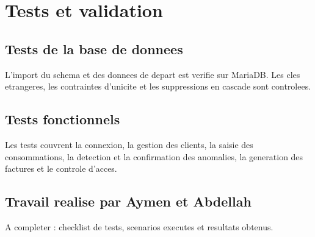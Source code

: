 \section{Tests et validation}

\subsection{Tests de la base de donnees}

L'import du schema et des donnees de depart est verifie sur MariaDB. Les cles etrangeres, les contraintes d'unicite et les suppressions en cascade sont controlees.

\subsection{Tests fonctionnels}

Les tests couvrent la connexion, la gestion des clients, la saisie des consommations, la detection et la confirmation des anomalies, la generation des factures et le controle d'acces.

\subsection{Travail realise par Aymen et Abdellah}

A completer : checklist de tests, scenarios executes et resultats obtenus.
